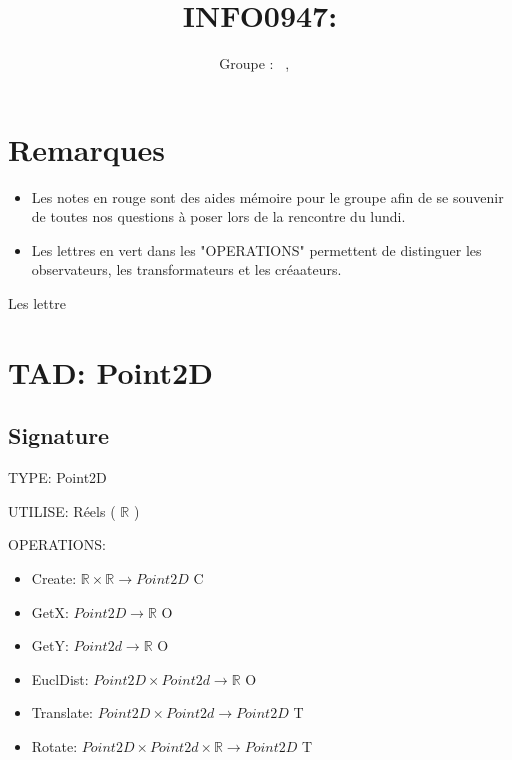 \documentclass[a4paper, 11pt, oneside]{article}
\title{INFO0947: \intitule}
\author{Groupe \GrNbr : \PrenomUN~\textsc{\NomUN}, \PrenomDEUX~\textsc{\NomDEUX}}
\date{}
\newcommand{\tablemat}{~}
\renewcommand{\tablemat}{\tableofcontents}
\begin{document}
\maketitle
\newpage
\tablemat
\newpage

\section{Remarques}
\begin{itemize}
    \item Les notes en {\color{red}rouge} sont des aides mémoire pour le groupe afin de se souvenir de toutes nos questions à poser lors de la rencontre du lundi.
    \item Les lettres en {\color{green}vert} dans les "OPERATIONS" permettent de distinguer les observateurs, les transformateurs et les créaateurs.
\end{itemize}


Les lettre

\section{TAD: Point2D}

\subsection{Signature}

\noindent TYPE: Point2D

\noindent UTILISE: Réels ( $\mathbb{R}$ )

\noindent OPERATIONS: 
\begin{itemize}
    \item Create: $\mathbb{R} \times \mathbb{R} \xrightarrow{} Point2D$ {\color{green} C}
    \item GetX: $Point2D \xrightarrow{} \mathbb{R}$ {\color{green} O}
    \item GetY: $Point2d \xrightarrow{} \mathbb{R}$ {\color{green} O}
    \item EuclDist: $Point2D \times Point2d \xrightarrow{} \mathbb{R}$ {\color{green} O}
    \item Translate: $Point2D \times Point2d \xrightarrow{} Point2D$ {\color{green} T}
    \item Rotate: $Point2D \times Point2d \times \mathbb{R} \xrightarrow{} Point2D $ {\color{green} T}
\end{itemize}
\end{document}
